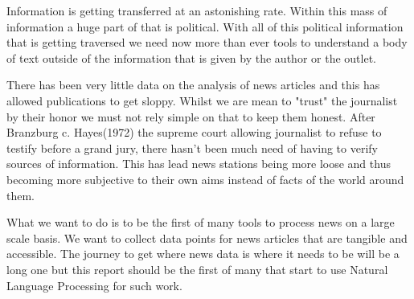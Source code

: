
Information is getting transferred at an astonishing rate.
Within this mass of information a huge part of that is political.
With all of this political information that is getting traversed we need now more than ever tools to understand a body of text outside of the information that is given by the author or the outlet.

There has been very little data on the analysis of news articles and this has allowed publications to get sloppy. 
Whilst we are mean to "trust" the journalist by their honor we must not rely simple on that to keep them honest.
After Branzburg c. Hayes(1972) the supreme court allowing journalist to refuse to testify before a grand jury, there hasn't been much need of having to verify sources of information. 
This has lead news stations being more loose and thus becoming more subjective to their own aims instead of facts of the world around them.

What we want to do is to be the first of many tools to process news on a large scale basis.
We want to collect data points for news articles that are tangible and accessible.
The journey to get where news data is where it needs to be will be a long one but this report should be the first of many that start to use Natural Language Processing for such work.
